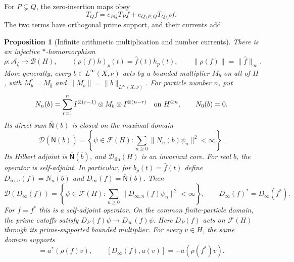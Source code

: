 \documentclass[11pt]{article}
\newtheorem{proposition}[theorem]{Proposition}
\theoremstyle{definition}
\theoremstyle{remark}
\numberwithin{equation}{section}
\newcommand{\cA}{\mathcal A}
\begin{document}
For $P\subsetneq Q$, the zero-insertion maps obey
\[
 T_Qf=e_{PQ}T_Pf+e_{Q\setminus P,Q}T_{Q\setminus P}f.
\]
The two terms have orthogonal prime support, and their currents add.

\begin{proposition}[Infinite arithmetic multiplication and number currents]
\label{prop:wc-infinite-multiplication}
There is an injective $*$-homomorphism
\[
 \rho:\cA_\zeta\longrightarrow\mathcal B(H),\qquad
 (\rho(f)h)_p(t)=\widehat f(t)h_p(t),\qquad
 \|\rho(f)\|=\|\widehat f\|_\infty.
\]
More generally, every $b\in L^\infty(X,\nu)$ acts by a bounded multiplier
$M_b$ on all of $H$, with $M_b^*=M_{\overline b}$ and
$\|M_b\|=\|b\|_{L^\infty(X,\nu)}$.
For particle number $n$, put
\[
 N_n(b)=\sum_{r=1}^n
 I^{\otimes(r-1)}\otimes M_b\otimes I^{\otimes(n-r)}
 \quad\hbox{on }H^{\odot n},\qquad N_0(b)=0.
\]
Its direct sum $\overline{\mathsf N}(b)$ is closed on the maximal domain
\begin{equation}
 \mathcal D(\overline{\mathsf N}(b))=
 \left\{\psi\in\mathcal F(H):
             \sum_{n\geq0}\|N_n(b)\psi_n\|^2<\infty\right\}.
 \label{eq:wc-number-maximal-domain}
\end{equation}
Its Hilbert adjoint is $\overline{\mathsf N}(\overline b)$, and
$\mathcal D_{\mathrm{fin}}(H)$ is an invariant core.
For real $b$, the operator is self-adjoint.
In particular, for $b_p(t)=\widehat f(t)$ define
$D_{\infty,n}(f)=N_n(b)$ and $D_\infty(f)=\overline{\mathsf N}(b)$.
Then
\begin{equation}
 \mathcal D(D_\infty(f))=
 \left\{\psi\in\mathcal F(H):
       \sum_{n\geq0}\|D_{\infty,n}(f)\psi_n\|^2<\infty\right\},
 \qquad D_\infty(f)^*=D_\infty(f^*).
 \label{eq:wc-infinite-number-domain}
\end{equation}
For $f=f^*$ this is a self-adjoint operator.
On the common finite-particle domain, the prime cutoffs satisfy
$D_P(f)\psi\to D_\infty(f)\psi$.
Here $D_P(f)$ acts on $\mathcal F(H)$ through its prime-supported
bounded multiplier.
For every $v\in H$, the same domain supports
\begin{equation}
 [D_\infty(f),a^*(v)]=a^*(\rho(f)v),\qquad
 [D_\infty(f),a(v)]=-a(\rho(f^*)v).
 \label{eq:wc-infinite-mixed}
\end{equation}
\end{proposition}
\end{document}

